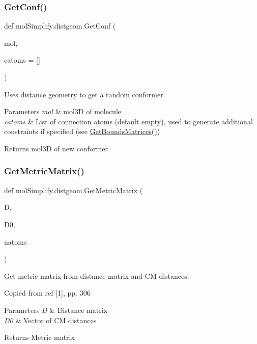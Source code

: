 \subsubsection{\texorpdfstring{Get\+Conf()}{GetConf()}}
{\footnotesize\ttfamily def mol\+Simplify.\+distgeom.\+Get\+Conf (\begin{DoxyParamCaption}\item[{}]{mol,  }\item[{}]{catoms = {\ttfamily \mbox{[}\mbox{]}} }\end{DoxyParamCaption})}



Uses distance geometry to get a random conformer. 


\begin{DoxyParams}{Parameters}
{\em mol} & mol3D of molecule \\
\hline
{\em catoms} & List of connection atoms (default empty), used to generate additional constraints if specified (see \hyperlink{namespacemolSimplify_1_1distgeom_a4bc2fea7054e74224acf7455ef2457c2}{Get\+Bounds\+Matrices()}) \\
\hline
\end{DoxyParams}
\begin{DoxyReturn}{Returns}
mol3D of new conformer 
\end{DoxyReturn}
\mbox{\label{namespacemolSimplify_1_1distgeom_a6d508087b38951d64ecc00438d3139d3}} 
\subsubsection{\texorpdfstring{Get\+Metric\+Matrix()}{GetMetricMatrix()}}
{\footnotesize\ttfamily def mol\+Simplify.\+distgeom.\+Get\+Metric\+Matrix (\begin{DoxyParamCaption}\item[{}]{D,  }\item[{}]{D0,  }\item[{}]{natoms }\end{DoxyParamCaption})}



Get metric matrix from distance matrix and CM distances. 

Copied from ref \mbox{[}1\mbox{]}, pp. 306 
\begin{DoxyParams}{Parameters}
{\em D} & Distance matrix \\
\hline
{\em D0} & Vector of CM distances \\
\hline
\end{DoxyParams}
\begin{DoxyReturn}{Returns}
Metric matrix 
\end{DoxyReturn}
\mbox{\label{namespacemolSimplify_1_1distgeom_aeea656ddbab4cd45d9229cf937cc5166}} 
